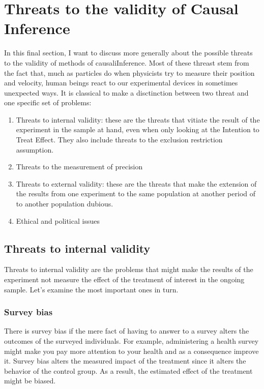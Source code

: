 \documentclass[
]{book}
\providecommand{\tightlist}{%
  \setlength{\itemsep}{0pt}\setlength{\parskip}{0pt}}
\theoremstyle{definition}
\theoremstyle{definition}
\theoremstyle{definition}
\theoremstyle{definition}
\theoremstyle{remark}
\begin{document}
\hypertarget{sec:threats}{%
\chapter{Threats to the validity of Causal Inference}\label{sec:threats}}

In this final section, I want to discuss more generally about the possible threats to the validity of methods of causaliInference.
Most of these threast stem from the fact that, much as particles do when physicists try to measure their position and velocity, human beings react to our experimental devices in sometimes unexpected ways.
It is classical to make a disctinction between two threat and one specific set of problems:

\begin{enumerate}
\def\labelenumi{\arabic{enumi}.}
\tightlist
\item
  Threats to internal validity: these are the threats that vitiate the result of the experiment in the sample at hand, even when only looking at the Intention to Treat Effect.
  They also include threats to the exclusion restriction assumption.
\item
  Threats to the measurement of precision
\item
  Threats to external validity: these are the threats that make the extension of the results from one experiment to the same population at another period of to another population dubious.
\item
  Ethical and political issues
\end{enumerate}

\hypertarget{threats-to-internal-validity}{%
\section{Threats to internal validity}\label{threats-to-internal-validity}}

Threats to internal validity are the problems that might make the results of the experiment not measure the effect of the treatment of interest in the ongoing sample.
Let's examine the most important ones in turn.

\hypertarget{survey-bias}{%
\subsection{Survey bias}\label{survey-bias}}

There is survey bias if the mere fact of having to answer to a survey alters the outcomes of the surveyed individuals.
For example, administering a health survey might make you pay more attention to your health and as a consequence improve it.
Survey bias alters the measured impact of the treatment since it alters the behavior of the control group.
As a result, the estimated effect of the treatment might be biased.
\end{document}
